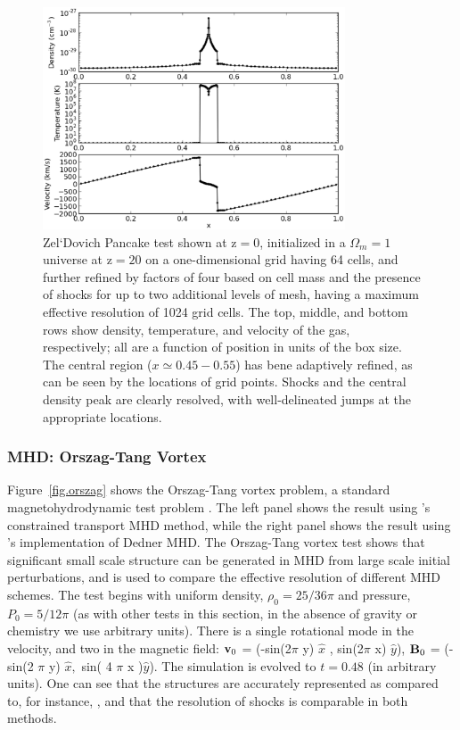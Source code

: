 \begin{figure}
\begin{center}
\includegraphics[width=0.8\textwidth]{figures/AMRZeldovichPancake.eps}
\caption{Zel`Dovich Pancake test shown at z$ = 0$, initialized in a
$\Omega_m = 1$ universe at z$ = 20$ on a one-dimensional grid having
64 cells, and further refined by factors of four based on cell mass
and the presence of shocks for up to two additional levels of mesh,
having a maximum effective resolution of 1024 grid cells. The top,
middle, and bottom rows show density, temperature, and velocity of the
gas, respectively; all are a function of position in units of the box
size.  The central region ($x \simeq 0.45-0.55$) has bene adaptively
refined, as can be seen by the locations of grid points.  Shocks and
the central density peak are clearly resolved, with well-delineated
jumps at the appropriate locations.}
\label{fig.pancake}
\end{center}
\end{figure}


\subsubsection{MHD: Orszag-Tang Vortex}
\label{sec.tests.mhd}
Figure~\ref{fig.orszag} shows the Orszag-Tang vortex problem, a
standard magnetohydrodynamic test problem \citep{Orszag79}.  The left panel shows
the result using \enzo's constrained transport MHD method, while the right panel shows the result using
\enzo's implementation of Dedner MHD.
The Orszag-Tang vortex test shows that significant small scale structure can be generated in MHD
from large scale initial perturbations, and is used to compare the
effective resolution of different MHD schemes.  The test begins with uniform
density, $\rho_0=25/36 \pi$ and pressure, $P_0=5/12 \pi$ (as with
other tests in this section, in the absence of gravity or chemistry we use
arbitrary units).  There is a
single rotational mode in the velocity, and two in the magnetic field:
${\bf v}_0 $ = (-sin(2$\pi$ y) $ \hat{x}$ , sin(2$\pi$ x) $\hat{y}$),
${\bf B}_0$ = (-sin(2 $\pi$ y) $ \hat{x},$ sin( 4 $\pi$ x )$\hat{y}$).
The simulation is evolved to $t=0.48$ (in arbitrary units).  One can see that the structures
are accurately represented as compared to, for instance,
\citet{Toth00}, and that the resolution of shocks is comparable in
both methods.

